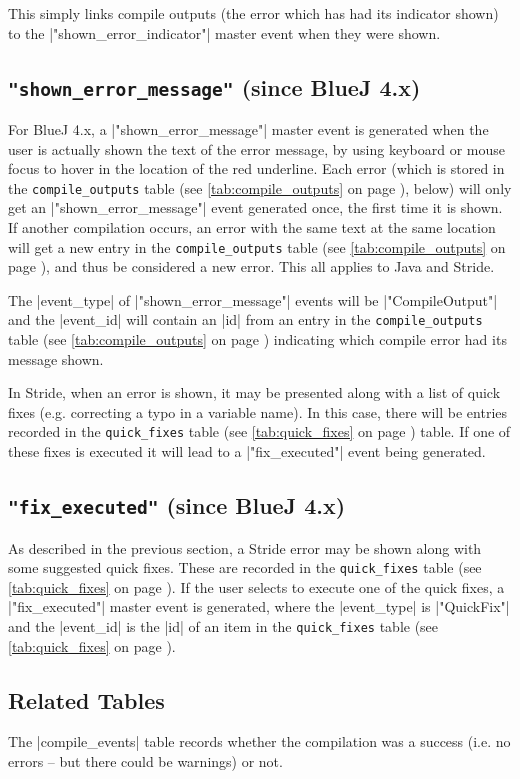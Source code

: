 \documentclass{report}
\newcommand{\myref}[1]{\autoref{#1} on page \pageref*{#1}}
\newcommand{\tabref}[1]{\lstinline|#1| table (see \myref{tab:#1})}
\begin{document}
This simply links compile outputs (the error which has had its indicator shown) to the
|"shown_error_indicator"| master event when they were shown.

\subsection{\lstinline!"shown_error_message"! (since BlueJ 4.x)}

For BlueJ 4.x, a |"shown_error_message"| master event is generated when the user is
actually shown the text of the error message, by using keyboard or mouse focus to hover in
the location of the red underline.  Each error (which is stored in the \tabref{compile_outputs}, below)
will only get an |"shown_error_message"| event generated once, the first time it is shown.  If another
compilation occurs, an error with the same text at the same location will get a new entry in the
\tabref{compile_outputs}, and thus be considered a new error.  This all applies to Java and Stride.

The |event_type| of |"shown_error_message"| events will be |"CompileOutput"| and the |event_id|
will contain an |id| from an entry in the \tabref{compile_outputs} indicating which compile error had its message shown.

In Stride, when an error is shown, it may be presented along with a list of quick fixes (e.g.
correcting a typo in a variable name).  In this case, there will be entries recorded in the
\tabref{quick_fixes} table.  If one of these fixes is executed it will lead to a |"fix_executed"|
event being generated.

\subsection{\lstinline!"fix_executed"! (since BlueJ 4.x)}

As described in the previous section, a Stride error may be shown along with some suggested quick
fixes.  These are recorded in the \tabref{quick_fixes}.  If the user selects to execute one
of the quick fixes, a |"fix_executed"| master event is generated, where the |event_type| is |"QuickFix"|
and the |event_id| is the |id| of an item in the \tabref{quick_fixes}.

\subsection{Related Tables}

The |compile_events| table records whether the compilation was a success
(i.e. no errors -- but there could be warnings) or not.
\end{document}
